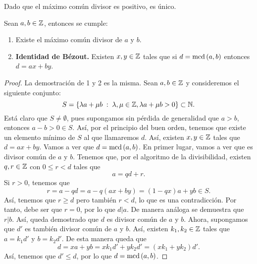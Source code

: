 \begin{observation}
Dado que el máximo común divisor es positivo, es único. 
\end{observation}
\begin{prop}
Sean $\displaystyle a,b \in \mathbb{Z} $, entonces se cumple:
\begin{enumerate}
\item Existe el máximo común divisor de $\displaystyle a $ y $\displaystyle b $.
\item \textbf{Identidad de Bézout.} Existen $\displaystyle x,y \in \mathbb{Z} $ tales que si $\displaystyle d = \text{mcd}\left(a,b\right) $ entonces $\displaystyle d = ax + by $.
\end{enumerate}
\end{prop}
\begin{proof}
La demostración de 1 y 2 es la misma. Sean $\displaystyle a, b \in \mathbb{Z} $ y consideremos el siguiente conjunto:
\[ S = \left\{ \lambda a + \mu b \; : \; \lambda, \mu \in \mathbb{Z}, \lambda a + \mu b > 0\right\} \subset \mathbb{N} .\]
Está claro que $\displaystyle S \neq \emptyset $, pues supongamos sin pérdida de generalidad que $\displaystyle a > b $, entonces $\displaystyle a - b > 0 \in S $. Así, por el principio del buen orden, tenemos que existe un elemento mínimo de $\displaystyle S $ al que llamaremos $\displaystyle d $. Así, existen $\displaystyle x,y \in \mathbb{Z} $ tales que $\displaystyle d = ax + by $. Vamos a ver que $\displaystyle d = \text{mcd}\left(a,b\right) $. En primer lugar, vamos a ver que es divisor común de $\displaystyle a $ y $\displaystyle b $. Tenemos que, por el algoritmo de la divisibilidad, existen $\displaystyle q, r \in \mathbb{Z} $ con $\displaystyle 0 \leq r < d $ tales que
\[a = qd + r .\]
Si $\displaystyle r > 0 $, tenemos que 
\[r = a - qd = a - q\left(ax + by\right) = \left(1-qx\right)a + yb \in S .\]
Así, tenemos que $\displaystyle r \geq d $ pero también $\displaystyle r < d $, lo que es una contradicción. Por tanto, debe ser que $\displaystyle r = 0 $, por lo que $\displaystyle d | a $. De manera análoga se demuestra que $\displaystyle r | b $. Así, queda demostrado que $\displaystyle d $ es divisor común de $\displaystyle a $ y $\displaystyle b $. Ahora, supongamos que $\displaystyle d' $ es también divisor común de $\displaystyle a $ y $\displaystyle b $. Así, existen $\displaystyle k_{1}, k_{2} \in \mathbb{Z} $ tales que $\displaystyle a = k_{1}d' $ y $\displaystyle b = k_{2}d' $. De esta manera queda que
\[d = xa + yb = xk_{1}d' + yk_{2}d' = \left(xk_{1} + yk_{2}\right)d' .\]
Así, tenemos que $\displaystyle d' \leq d $, por lo que $\displaystyle d = \text{mcd}\left(a,b\right) $.
\end{proof}

